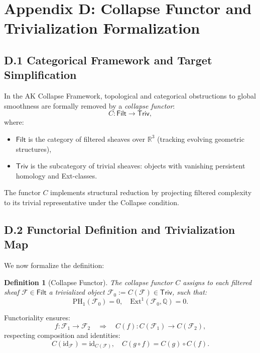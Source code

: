 \documentclass[11pt]{article}
\newtheorem{definition}[theorem]{Definition}
\begin{document}
\appendix
\section*{Appendix D: \texorpdfstring{Collapse Functor and Trivialization Formalization}{Collapse Functor and Trivialization Formalization}}

\subsection{D.1 Categorical Framework and Target Simplification}

In the AK Collapse Framework, topological and categorical obstructions to global smoothness are formally removed by a \emph{collapse functor}:
\[
C : \mathsf{Filt} \longrightarrow \mathsf{Triv},
\]
where:
\begin{itemize}
  \item \( \mathsf{Filt} \) is the category of filtered sheaves over \( \mathbb{R}^3 \) (tracking evolving geometric structures),
  \item \( \mathsf{Triv} \) is the subcategory of trivial sheaves: objects with vanishing persistent homology and Ext-classes.
\end{itemize}

The functor \( C \) implements structural reduction by projecting filtered complexity to its trivial representative under the Collapse condition.

\subsection{D.2 Functorial Definition and Trivialization Map}

We now formalize the definition:

\begin{definition}[Collapse Functor]
The collapse functor \( C \) assigns to each filtered sheaf \( \mathcal{F} \in \mathsf{Filt} \) a trivialized object \( \mathcal{F}_0 := C(\mathcal{F}) \in \mathsf{Triv} \), such that:
\[
\mathrm{PH}_1(\mathcal{F}_0) = 0, \quad \mathrm{Ext}^1(\mathcal{F}_0, \mathbb{Q}) = 0.
\]
\end{definition}

Functoriality ensures:
\[
f : \mathcal{F}_1 \to \mathcal{F}_2 \quad \Rightarrow \quad C(f) : C(\mathcal{F}_1) \to C(\mathcal{F}_2),
\]
respecting composition and identities:
\[
C(\mathrm{id}_{\mathcal{F}}) = \mathrm{id}_{C(\mathcal{F})}, \quad C(g \circ f) = C(g) \circ C(f).
\]
\end{document}
